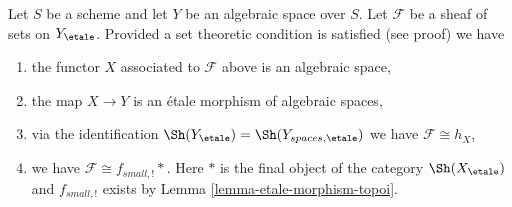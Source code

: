 \begin{lemma}
\label{lemma-sheaf-gives-space}
Let $S$ be a scheme and let $Y$ be an algebraic space over $S$.
Let $\mathcal{F}$ be a sheaf of sets on $Y_\etale$.
Provided a set theoretic condition is satisfied (see proof) we have
\begin{enumerate}
\item the functor $X$ associated to $\mathcal{F}$ above is an
algebraic space,
\item the map $X \to Y$ is an \'etale morphism of algebraic spaces,
\item via the identification $\Sh(Y_\etale) = \Sh(Y_{spaces, \etale})$
we have $\mathcal{F} \cong h_X$,
\item we have $\mathcal{F} \cong f_{small, !}*$. Here $*$ is the final object
of the category $\Sh(X_\etale)$ and $f_{small, !}$ exists by
Lemma \ref{lemma-etale-morphism-topoi}.
\end{enumerate}
\end{lemma}

